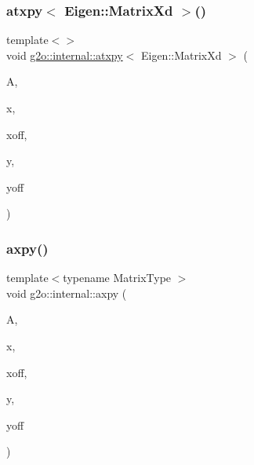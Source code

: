 \mbox{\label{namespaceg2o_1_1internal_a063a16cf91e9762c9ce6c387463cf716}} 
\subsubsection{\texorpdfstring{atxpy$<$ Eigen\+::\+Matrix\+Xd $>$()}{atxpy< Eigen::MatrixXd >()}}
{\footnotesize\ttfamily template$<$$>$ \\
void \mbox{\hyperlink{namespaceg2o_1_1internal_ad176878dff85b91f1dbabed52cbf696e}{g2o\+::internal\+::atxpy}}$<$ Eigen\+::\+Matrix\+Xd $>$ (\begin{DoxyParamCaption}\item[{const Eigen\+::\+Matrix\+Xd \&}]{A,  }\item[{const Eigen\+::\+Map$<$ const Eigen\+::\+Vector\+Xd $>$ \&}]{x,  }\item[{int}]{xoff,  }\item[{Eigen\+::\+Map$<$ Eigen\+::\+Vector\+Xd $>$ \&}]{y,  }\item[{int}]{yoff }\end{DoxyParamCaption})\hspace{0.3cm}{\ttfamily [inline]}}

\mbox{\label{namespaceg2o_1_1internal_a3beb413c2d04c629c60a8ce5e05ddf8f}} 
\subsubsection{\texorpdfstring{axpy()}{axpy()}\hspace{0.1cm}{\footnotesize\ttfamily [1/2]}}
{\footnotesize\ttfamily template$<$typename Matrix\+Type $>$ \\
void g2o\+::internal\+::axpy (\begin{DoxyParamCaption}\item[{const Matrix\+Type \&}]{A,  }\item[{const Eigen\+::\+Map$<$ const Eigen\+::\+Vector\+Xd $>$ \&}]{x,  }\item[{int}]{xoff,  }\item[{Eigen\+::\+Map$<$ Eigen\+::\+Vector\+Xd $>$ \&}]{y,  }\item[{int}]{yoff }\end{DoxyParamCaption})\hspace{0.3cm}{\ttfamily [inline]}}

